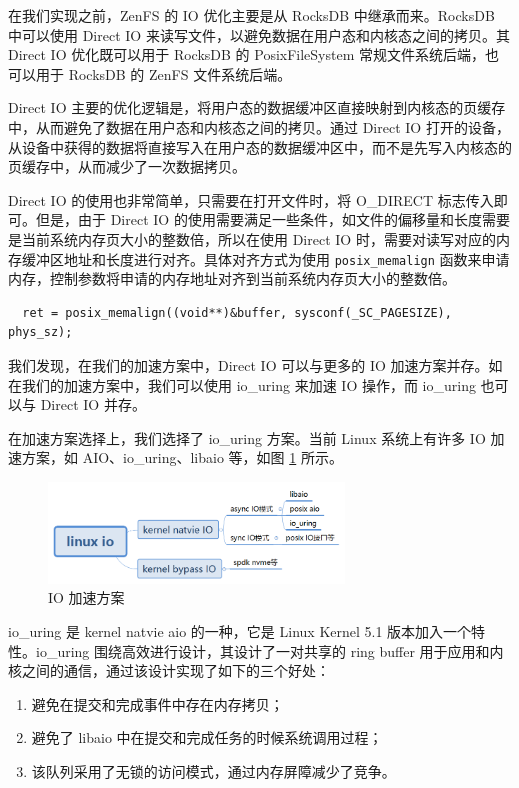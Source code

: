 在我们实现之前，ZenFS 的 IO 优化主要是从 RocksDB 中继承而来。RocksDB 中可以使用 Direct IO 来读写文件，以避免数据在用户态和内核态之间的拷贝。其 Direct IO 优化既可以用于 RocksDB 的 PosixFileSystem 常规文件系统后端，也可以用于 RocksDB 的 ZenFS 文件系统后端。

Direct IO 主要的优化逻辑是，将用户态的数据缓冲区直接映射到内核态的页缓存中，从而避免了数据在用户态和内核态之间的拷贝。通过 Direct IO 打开的设备，从设备中获得的数据将直接写入在用户态的数据缓冲区中，而不是先写入内核态的页缓存中，从而减少了一次数据拷贝。

Direct IO 的使用也非常简单，只需要在打开文件时，将 O\_DIRECT 标志传入即可。但是，由于 Direct IO 的使用需要满足一些条件，如文件的偏移量和长度需要是当前系统内存页大小的整数倍，所以在使用 Direct IO 时，需要对读写对应的内存缓冲区地址和长度进行对齐。具体对齐方式为使用 \verb|posix_memalign| 函数来申请内存，控制参数将申请的内存地址对齐到当前系统内存页大小的整数倍。

\begin{lstlisting}
  ret = posix_memalign((void**)&buffer, sysconf(_SC_PAGESIZE), phys_sz);
\end{lstlisting}

我们发现，在我们的加速方案中，Direct IO 可以与更多的 IO 加速方案并存。如在我们的加速方案中，我们可以使用 io\_uring 来加速 IO 操作，而 io\_uring 也可以与 Direct IO 并存。

在加速方案选择上，我们选择了 io\_uring 方案。当前 Linux 系统上有许多 IO 加速方案，如 AIO、io\_uring、libaio 等，如图 \ref{io-speedup} 所示。

\begin{figure}[htbp]
  \centering
  \includegraphics[width=0.7\textwidth]{fig/io-speedup}
  \caption{IO 加速方案}
  \label{io-speedup}
\end{figure}

io\_uring 是 kernel natvie aio 的一种，它是 Linux Kernel 5.1 版本加入一个特性。io\_uring 围绕高效进行设计，其设计了一对共享的 ring buffer 用于应用和内核之间的通信，通过该设计实现了如下的三个好处：

\begin{enumerate}
  \item 避免在提交和完成事件中存在内存拷贝；
  \item 避免了 libaio 中在提交和完成任务的时候系统调用过程；
  \item 该队列采用了无锁的访问模式，通过内存屏障减少了竞争。
\end{enumerate}

